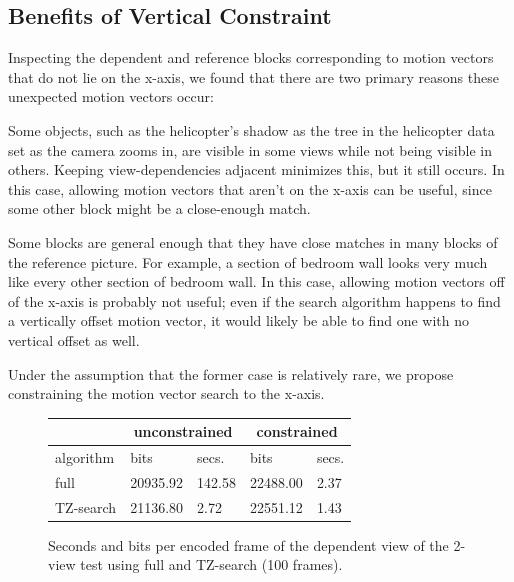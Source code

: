 \documentclass{sig-alternate-05-2015}
\begin{document}
\subsection{Benefits of Vertical Constraint}
\label{subsec:constrained}

Inspecting the dependent and reference blocks corresponding to motion vectors
that do not lie on the x-axis, we found that there are two primary reasons these
unexpected motion vectors occur: \begin{compactitem}
\item Some objects, such as the helicopter's shadow as the tree in the helicopter
data set as the camera zooms in, are visible in some views while not being visible
in others. Keeping view-dependencies adjacent minimizes this, but it still occurs.
In this case, allowing motion vectors that aren't on the x-axis can be useful,
since some other block might be a close-enough match.
\item Some blocks are general enough that they have close matches in many blocks
of the reference picture. For example, a section of bedroom wall looks very much
like every other section of bedroom wall. In this case, allowing motion vectors
off of the x-axis is probably not useful; even if the search algorithm happens
to find a vertically offset motion vector, it would likely be able to find one
with no vertical offset as well. \end{compactitem} Under the assumption that the
former case is relatively rare, we propose constraining the motion vector search
to the x-axis.

\begin{figure}[H]
\centering\small
\begin{tabular}{|l|l|l|l|l|}
\multicolumn{1}{c}{} & \multicolumn{2}{c}{unconstrained} & \multicolumn{2}{c}{constrained} \\ \hline
algorithm            & bits            & secs.           & bits            & secs.         \\ \hline
full                 & 20935.92        & 142.58          & 22488.00        & 2.37          \\ \hline
TZ-search            & 21136.80        & 2.72            & 22551.12        & 1.43          \\ \hline
\end{tabular}
\caption{Seconds and bits per encoded frame of the dependent view of the
2-view test using full and TZ-search (100 frames).}
\label{fig:time-full-fast}
\end{figure}
\end{document}
